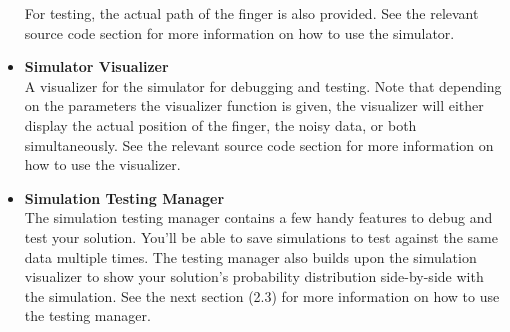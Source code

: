 \documentclass{article}
\begin{document}
\begin{itemize}
    For testing, the actual path of the finger is also provided. See the relevant source code section for more information on how to use the simulator.
    \item \textbf{Simulator Visualizer}\\
    A visualizer for the simulator for debugging and testing. Note that depending on the parameters the visualizer function is given, the visualizer will either display the actual position of the finger, the noisy data, or both simultaneously. See the relevant source code section for more information on how to use the visualizer.
    \item \textbf{Simulation Testing Manager}\\
    The simulation testing manager contains a few handy features to debug and test your solution. You'll be able to save simulations to test against the same data multiple times. The testing manager also builds upon the simulation visualizer to show your solution's probability distribution side-by-side with the simulation. See the next section (2.3) for more information on how to use the testing manager.
\end{itemize}
\end{document}
